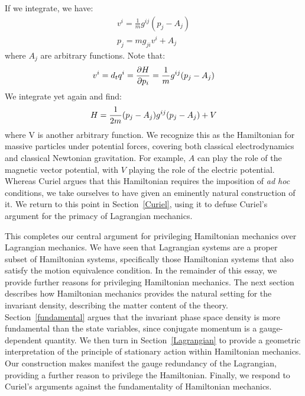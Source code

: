 \documentclass[letterpaper]{article}
\begin{document}
If we integrate, we have:
\begin{equation} \label{linear_relationship}
\begin{aligned}
v^i = \frac{1}{m} g^{ij}(p_j - A_j) \\
p_j = m g_{ji} v^i + A_j
\end{aligned}
\end{equation}
where $A_j$ are arbitrary functions. Note that:
\begin{equation}
v^i = d_t q^i = \frac{\partial H }{\partial p_i} = \frac{1}{m} g^{ij}(p_j - A_j) \\
\end{equation}
We integrate yet again and find:
\begin{equation} \label{massive_Hamiltonian}
H = \frac{1}{2m} (p_j - A_j) g^{ij}(p_j - A_j) + V \\
\end{equation}
where V is another arbitrary function. We recognize this as the Hamiltonian for massive particles under potential forces, covering both classical electrodynamics and classical Newtonian gravitation. For example, $A$ can play the role of the magnetic vector potential, with $V$ playing the role of the electric potential. Whereas Curiel \parencites*[]{Curiel} argues that this Hamiltonian requires the imposition of \textit{ad hoc} conditions, we take ourselves to have given an eminently natural construction of it. We return to this point in Section~\ref{Curiel}, using it to defuse Curiel's argument for the primacy of Lagrangian mechanics.

This completes our central argument for privileging Hamiltonian mechanics over Lagrangian mechanics. We have seen that Lagrangian systems are a proper subset of Hamiltonian systems, specifically those Hamiltonian systems that also satisfy the motion equivalence condition. In the remainder of this essay, we provide further reasons for privileging Hamiltonian mechanics. The next section describes how Hamiltonian mechanics provides the natural setting for the invariant density, describing the matter content of the theory. Section~\ref{fundamental} argues that the invariant phase space density is more fundamental than the state variables, since conjugate momentum is a gauge-dependent quantity. We then turn in Section~\ref{Lagrangian} to provide a geometric interpretation of the principle of stationary action within Hamiltonian mechanics. Our construction makes manifest the gauge redundancy of the Lagrangian, providing a further reason to privilege the Hamiltonian. Finally, we respond to Curiel's arguments against the fundamentality of Hamiltonian mechanics.
\end{document}
